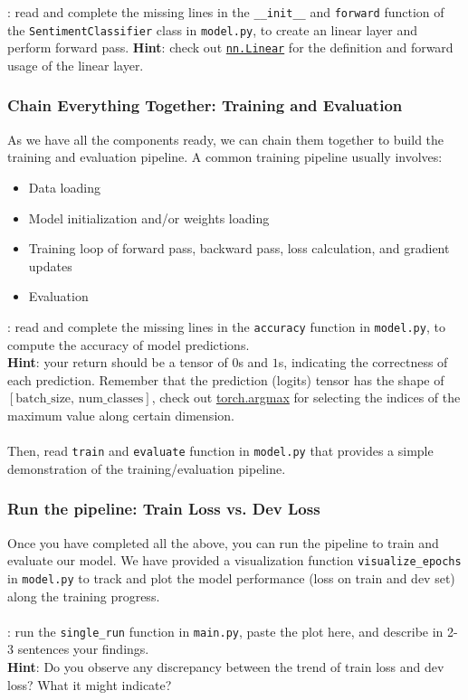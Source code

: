 \documentclass{article}
\begin{document}
\noindent\todo{}: read and complete the missing lines in the \texttt{\_\_init\_\_} and \texttt{forward} function of the \texttt{SentimentClassifier} class in \texttt{model.py}, to create an linear layer and perform forward pass.
\noindent \textbf{Hint}: check out \href{https://pytorch.org/docs/stable/generated/torch.nn.Linear.html}{\texttt{nn.Linear}} for the definition and forward usage of the linear layer.

\subsubsection{Chain Everything Together: Training and Evaluation} \noindent As we have all the components ready, we can chain them together to build the training and evaluation pipeline. A common training pipeline usually involves:
\begin{itemize}
    \item Data loading
    \item Model initialization and/or weights loading
    \item Training loop of forward pass, backward pass, loss calculation, and gradient updates
    \item Evaluation
\end{itemize}

\noindent \todo{}: read and complete the missing lines in the \texttt{accuracy} function in \texttt{model.py}, to compute the accuracy of model predictions.\\
\noindent \textbf{Hint}: your return should be a tensor of $0$s and $1$s, indicating the correctness of each prediction. Remember that the prediction (logits) tensor has the shape of $[\text{batch\_size}, \, \text{num\_classes}]$, check out \href{https://pytorch.org/docs/stable/generated/torch.argmax.html}{torch.argmax} for selecting the indices of the maximum value along certain dimension.\\\\
Then, read \texttt{train} and \texttt{evaluate} function in \texttt{model.py} that provides a simple demonstration of the training/evaluation pipeline.

\subsubsection{Run the pipeline: Train Loss vs. Dev Loss}
Once you have completed all the \todo{} above, you can run the pipeline to train and evaluate our model. We have provided a visualization function \texttt{visualize\_epochs} in \texttt{model.py} to track and plot the model performance (loss on train and dev set) along the training progress.\\\\
\noindent \todo{}: run the \texttt{single\_run} function in \texttt{main.py}, paste the plot here, and describe in 2-3 sentences your findings.\\
\noindent \textbf{Hint}: Do you observe any discrepancy between the trend of train loss and dev loss? What it might indicate?
\\\\
\noindent {\color{red}{your plots and answer:}}\\
\end{document}
